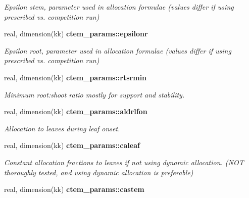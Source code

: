 \begin{DoxyCompactItemize}
\begin{DoxyCompactList}\small\item\em Epsilon stem, parameter used in allocation formulae (values differ if using prescribed vs. competition run) \end{DoxyCompactList}\item 
\hypertarget{namespacectem__params_aa0fc6a57a8dd09d0a6d57ccf9c2fdf5b}{}real, dimension(kk) {\bfseries ctem\+\_\+params\+::epsilonr}\label{namespacectem__params_aa0fc6a57a8dd09d0a6d57ccf9c2fdf5b}

\begin{DoxyCompactList}\small\item\em Epsilon root, parameter used in allocation formulae (values differ if using prescribed vs. competition run) \end{DoxyCompactList}\item 
\hypertarget{namespacectem__params_ac542a7713cfae8ce6e7197c8d60c2081}{}real, dimension(kk) {\bfseries ctem\+\_\+params\+::rtsrmin}\label{namespacectem__params_ac542a7713cfae8ce6e7197c8d60c2081}

\begin{DoxyCompactList}\small\item\em Minimum root\+:shoot ratio mostly for support and stability. \end{DoxyCompactList}\item 
\hypertarget{namespacectem__params_ab8a436206695f5f6c93d0579187ba037}{}real, dimension(kk) {\bfseries ctem\+\_\+params\+::aldrlfon}\label{namespacectem__params_ab8a436206695f5f6c93d0579187ba037}

\begin{DoxyCompactList}\small\item\em Allocation to leaves during leaf onset. \end{DoxyCompactList}\item 
\hypertarget{namespacectem__params_a593225b4810a8b566176f0ada4a2ad7a}{}real, dimension(kk) {\bfseries ctem\+\_\+params\+::caleaf}\label{namespacectem__params_a593225b4810a8b566176f0ada4a2ad7a}

\begin{DoxyCompactList}\small\item\em Constant allocation fractions to leaves if not using dynamic allocation. (N\+O\+T thoroughly tested, and using dynamic allocation is preferable) \end{DoxyCompactList}\item 
\hypertarget{namespacectem__params_aa2fad05936bda6d7d58531f2a19d1b7b}{}real, dimension(kk) {\bfseries ctem\+\_\+params\+::castem}\label{namespacectem__params_aa2fad05936bda6d7d58531f2a19d1b7b}


\end{DoxyCompactItemize}
